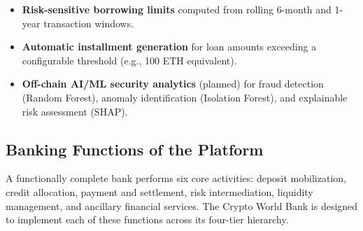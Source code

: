 \documentclass[acmsmall,screen,review]{acmart}
\begin{document}
\begin{itemize}[noitemsep]
\item \textbf{Risk-sensitive borrowing limits} computed from rolling 6-month and 1-year transaction windows.
\item \textbf{Automatic installment generation} for loan amounts exceeding a configurable threshold (e.g., 100 ETH equivalent).
\item \textbf{Off-chain AI/ML security analytics} (planned) for fraud detection (Random Forest), anomaly identification (Isolation Forest), and explainable risk assessment (SHAP).
\end{itemize}

\subsection{Banking Functions of the Platform}

A functionally complete bank performs six core activities: deposit mobilization, credit allocation, payment and settlement, risk intermediation, liquidity management, and ancillary financial services. The Crypto World Bank is designed to implement each of these functions across its four-tier hierarchy.
\end{document}
